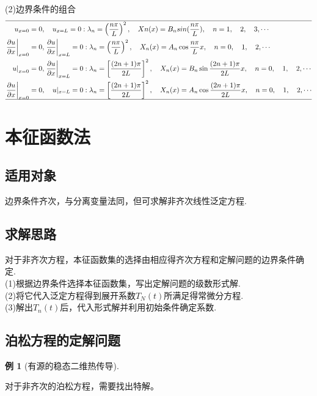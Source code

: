 \documentclass[11pt, a4paper, twoside]{ctexbook}
\newtheorem{example}[theorem]{例}
\begin{document}
(2)边界条件的组合
$$\overline{\begin{aligned}u_{x=0}&=0,\quad u_{x=L}=0:\lambda_n=\left(\frac{n\pi}L\right)^2,\quad Xn(x) = B_nsin(\frac{n\pi}{L}), \quad n = 1,\quad2,\quad3,\cdots\\\left.\frac{\partial u}{\partial x}\right|_{x=0}&=0,\left.\frac{\partial u}{\partial x}\right|_{x=L}=0:\lambda_n=\left(\frac{n\pi}L\right)^2,\quad X_n(x)=A_n\cos\frac{n\pi}Lx,\quad n=0,\quad1,\quad2,\cdots\\\left.u\right|_{x=0}&=0,\left.\frac{\partial u}{\partial x}\right|_{x=L}=0:\lambda_n=\left[\frac{(2n+1)\pi}{2L}\right]^2,\quad X_n(x)=B_n\sin\frac{(2n+1)\pi}{2L}x,\quad n=0,\quad1,\quad2,\cdots\\\left.\frac{\partial u}{\partial x}\right|_{x=0}&=0,\quad u|_{x=L}=0:\lambda_n=\left[\frac{(2n+1)\pi}{2L}\right]^2,\quad X_n(x)=A_n\cos\frac{(2n+1)\pi}{2L}x,\quad n=0,\quad1,\quad2,\cdots\\\hline\end{aligned}}$$
\section{本征函数法}
\subsection{适用对象}
边界条件齐次，与分离变量法同，但可求解非齐次线性泛定方程.
\subsection{求解思路}
对于非齐次方程，本征函数集的选择由相应得齐次方程和定解问题的边界条件确定.\\
(1)根据边界条件选择本征函数集，写出定解问题的级数形式解.\\
(2)将它代入泛定方程得到展开系数$T_N(t)$所满足得常微分方程.\\
(3)解出$T_n(t)$后，代入形式解并利用初始条件确定系数.
\subsection{泊松方程的定解问题}
\begin{example}[有源的稳态二维热传导]
   
\end{example}
对于非齐次的泊松方程，需要找出特解。
\newpage{}
\end{document}
